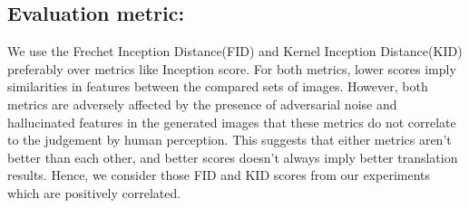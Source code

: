 \documentclass[a4paper,twoside]{article}
\begin{document}
\subsection{Evaluation metric:}
\label{evaluation metric}
\noindent
We use the Frechet Inception Distance(FID) \cite{FID_HeuselRUNKH17} and Kernel Inception Distance(KID) \cite{KID_MMD_GAN} preferably over metrics like Inception score. For both metrics, lower scores imply similarities in features between the compared sets of images. However, both metrics are adversely affected by the presence of adversarial noise and hallucinated features in the generated images that these metrics do not correlate to the judgement by human perception. This suggests that either metrics aren't better than each other, and better scores doesn't always imply better translation results. Hence, we consider those FID and KID scores from our experiments which are positively correlated. 
\begin{table}[!hb]
\centering
\caption{KID $\times$ 100 $\pm$ std. $\times$ 100 compared for different methods \cite{DiscoGAN_KimCKLK17}, \cite{Residual-Attention_WangJQYLZWT17}, \cite{DualGAN_YiZTG17}, \cite{UNIT_LiuBK17}, \cite{CycleGAN2017}, \cite{Mejjati2018UAIT}, \cite{attentionGAN}(from left to right). Abbreviations: (H)orse, (Z)ebra (A)pple, (O)range.}
\label{tab:KID score comparison on various methods}
\end{table}
\end{document}

